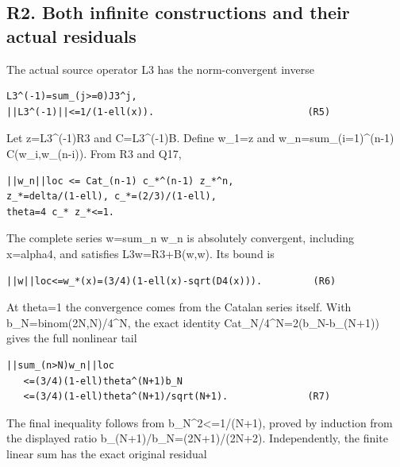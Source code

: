 \documentclass[11pt,a4paper]{article}
\renewcommand{\[}{\begingroup\small\originaldisplaystart}
\renewcommand{\]}{\originaldisplayend\endgroup}
\begin{document}
\subsection{R2. Both infinite constructions and their actual
residuals}\label{r2.-both-infinite-constructions-and-their-actual-residuals}

The actual source operator L3 has the norm-convergent inverse

\begin{verbatim}
L3^(-1)=sum_(j>=0)J3^j,
||L3^(-1)||<=1/(1-ell(x)).                           (R5)
\end{verbatim}

Let z=L3\^{}(-1)R3 and C=L3\^{}(-1)B. Define w\_1=z and
{\ttfamily w\allowbreak{}\_\allowbreak{}n\allowbreak{}=\allowbreak{}s\allowbreak{}u\allowbreak{}m\allowbreak{}\_\allowbreak{}(\allowbreak{}i\allowbreak{}=\allowbreak{}1\allowbreak{})\allowbreak{}\textasciicircum{}\allowbreak{}(\allowbreak{}n\allowbreak{}-\allowbreak{}1\allowbreak{})\allowbreak{} \allowbreak{}C\allowbreak{}(\allowbreak{}w\allowbreak{}\_\allowbreak{}i\allowbreak{},\allowbreak{}w\allowbreak{}\_\allowbreak{}(\allowbreak{}n\allowbreak{}-\allowbreak{}i\allowbreak{})\allowbreak{})\allowbreak{}}.
From R3 and Q17,

\begin{verbatim}
||w_n||loc <= Cat_(n-1) c_*^(n-1) z_*^n,
z_*=delta/(1-ell), c_*=(2/3)/(1-ell),
theta=4 c_* z_*<=1.
\end{verbatim}

The complete series w=sum\_n w\_n is absolutely convergent, including
x=alpha4, and satisfies L3w=R3+B(w,w). Its bound is

\begin{verbatim}
||w||loc<=w_*(x)=(3/4)(1-ell(x)-sqrt(D4(x))).         (R6)
\end{verbatim}

At theta=1 the convergence comes from the Catalan series itself. With
b\_N=binom(2N,N)/4\^{}N, the exact identity
Cat\_N/4\^{}N=2(b\_N-b\_(N+1)) gives the full nonlinear tail

\begin{verbatim}
||sum_(n>N)w_n||loc
   <=(3/4)(1-ell)theta^(N+1)b_N
   <=(3/4)(1-ell)theta^(N+1)/sqrt(N+1).              (R7)
\end{verbatim}

The final inequality follows from b\_N\^{}2\textless=1/(N+1), proved by
induction from the displayed ratio b\_(N+1)/b\_N=(2N+1)/(2N+2).
Independently, the finite linear sum has the exact original residual
\end{document}
